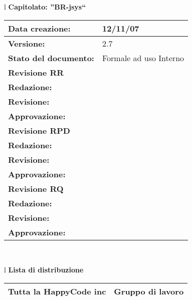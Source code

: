 

\newcommand{\lv}{ 2.7 } %
\newcommand{\dt}{ Norme Di Progetto }%



\begin{center}
\thispagestyle{plain}
\begin{table}[htbp]
\large{
\begin{tabular}{l}
\Large{\textbf{\textsf{Capitolato: ''BR-jsys``}}} \\
\begin{tabular}{|p{6cm}|p{6cm}|}
\hline
\textbf{Data creazione:} & 12/11/07 \\
\hline
\textbf{Versione:} & \lv \\ \hline
\textbf{Stato del documento:} & Formale ad uso Interno \\ \hline
\textbf{Revisione RR} &      \\ \hline
\textbf{Redazione:} & \FC \\ \hline
\textbf{Revisione:} & \MT \\ \hline
\textbf{Approvazione:}  & \ET \\ \hline
\textbf{Revisione RPD} & \\ \hline
\textbf{Redazione:} & \ET \\ \hline
\textbf{Revisione:} & \FC \\ \hline
\textbf{Approvazione:} & \MM \\ \hline
\textbf{Revisione RQ} & \\ \hline
\textbf{Redazione:} & \MT \\ \hline
\textbf{Revisione:} &  \ET\\ \hline
\textbf{Approvazione:} &  \AT\\ \hline
\end{tabular} \\
\end{tabular}
}
\end{table}

\begin{table}[hbtp]
\large{
\begin{tabular}{l}
\Large{\textbf{\textsf{Lista di distribuzione}}} \\
\begin{tabular}{|p{6cm}|p{6cm}|} \hline
{Tutta la HappyCode inc}& Gruppo di lavoro \\ \hline
\end{tabular} \\
\end{tabular}
}
\end{table}


\end{center}
